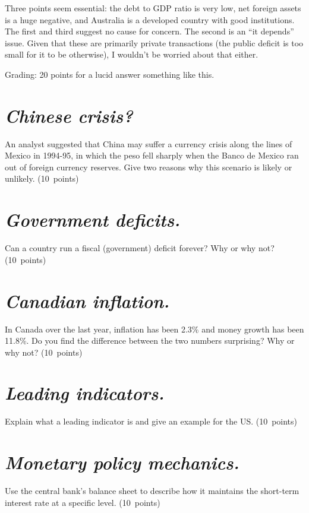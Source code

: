 \documentclass[letterpaper,12pt]{exam}
\begin{document}
\begin{questions}
\begin{solution}
\begin{parts}
Three points seem essential:
the debt to GDP ratio is very low,
net foreign assets is a huge negative,
and Australia  is a developed country with good institutions.
The first and third suggest no cause for concern.
The second is an ``it depends'' issue.  Given that these
are primarily private transactions
(the public deficit is too small for it to be otherwise),
I wouldn't be worried about that either.

Grading:  20 points for a lucid answer something like this.

\end{parts}
\end{solution}


\begin{parts}
\part {\it Chinese crisis?\/}
An analyst suggested that China may suffer a currency crisis
along the lines of Mexico in 1994-95,
in which the peso fell sharply when the Banco de Mexico
ran out of foreign currency reserves.
Give two reasons why this scenario is likely or unlikely.
 (10~points)

\part {\it Government deficits.\/}
Can a country run a fiscal (government) deficit forever?
Why or why not?
 (10~points)


\part {\it Canadian inflation.\/}
In Canada over the last year, inflation has been 2.3\%
and money growth  has been 11.8\%.
Do you find the difference between the two numbers surprising?
Why or why not?  (10~points)

\part {\it Leading indicators.\/}
Explain what a leading indicator is
and give an example for the US.  (10~points)

\part {\it Monetary policy mechanics.\/}
Use the central bank's balance sheet to describe
how it
maintains the short-term interest rate at a specific level.
(10~points)
\end{parts}


\end{questions}
\end{document}
